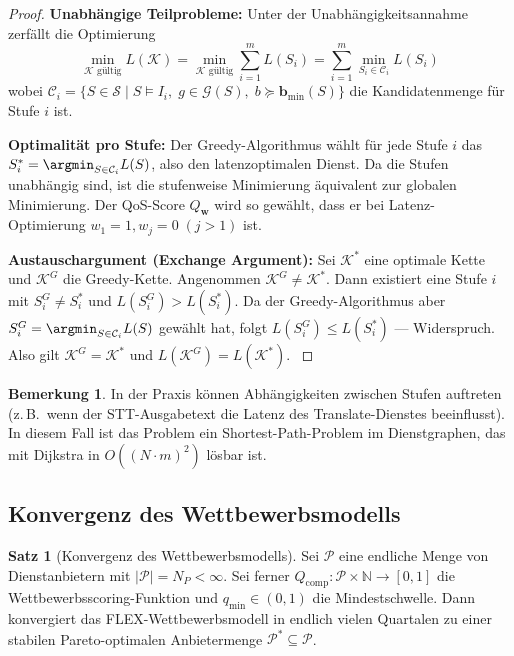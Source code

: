 ﻿\documentclass[a4paper,12pt]{article}
\theoremstyle{definition}
\newtheorem{satz}{Satz}
\newtheorem{bemerkung}{Bemerkung}
\begin{document}
\begin{proof}
\textbf{Unabhängige Teilprobleme:} Unter der Unabhängigkeitsannahme zerfällt die Optimierung
\[
\min_{\mathcal{K} \text{ gültig}} L(\mathcal{K}) = \min_{\mathcal{K} \text{ gültig}} \sum_{i=1}^m L(S_i) = \sum_{i=1}^m \min_{S_i \in \mathcal{C}_i} L(S_i)
\]
wobei $\mathcal{C}_i = \{S \in \mathcal{S} \mid S \models I_i,\; g \in \mathcal{G}(S),\; b \succeq \mathbf{b}_{\min}(S)\}$ die Kandidatenmenge für Stufe $i$ ist.

\textbf{Optimalität pro Stufe:} Der Greedy-Algorithmus wählt für jede Stufe $i$ das $S_i^* = \argmin_{S \in \mathcal{C}_i} L(S)$, also den latenzoptimalen Dienst. Da die Stufen unabhängig sind, ist die stufenweise Minimierung äquivalent zur globalen Minimierung. Der QoS-Score $Q_{\mathbf{w}}$ wird so gewählt, dass er bei Latenz-Optimierung $w_1 = 1, w_j = 0\; (j > 1)$ ist.

\textbf{Austauschargument (Exchange Argument):} Sei $\mathcal{K}^*$ eine optimale Kette und $\mathcal{K}^G$ die Greedy-Kette. Angenommen $\mathcal{K}^G \neq \mathcal{K}^*$. Dann existiert eine Stufe $i$ mit $S_i^G \neq S_i^*$ und $L(S_i^G) > L(S_i^*)$. Da der Greedy-Algorithmus aber $S_i^G = \argmin_{S \in \mathcal{C}_i} L(S)$ gewählt hat, folgt $L(S_i^G) \leq L(S_i^*)$ --- Widerspruch. Also gilt $\mathcal{K}^G = \mathcal{K}^*$ und $L(\mathcal{K}^G) = L(\mathcal{K}^*)$. $
$
\end{proof}

\begin{bemerkung}
In der Praxis können Abhängigkeiten zwischen Stufen auftreten (z.\,B.\ wenn der STT-Ausgabetext die Latenz des Translate-Dienstes beeinflusst). In diesem Fall ist das Problem ein Shortest-Path-Problem im Dienstgraphen, das mit Dijkstra in $O((N \cdot m)^2)$ lösbar ist.
\end{bemerkung}

\subsection{Konvergenz des Wettbewerbsmodells}

\begin{satz}[Konvergenz des Wettbewerbsmodells]
\label{satz:konvergenz}
Sei $\mathcal{P}$ eine endliche Menge von Dienstanbietern mit $|\mathcal{P}| = N_P < \infty$. Sei ferner $Q_\mathrm{comp}: \mathcal{P} \times \mathbb{N} \to [0,1]$ die Wettbewerbsscoring-Funktion und $q_\mathrm{min} \in (0,1)$ die Mindestschwelle. Dann konvergiert das FLEX-Wettbewerbsmodell in endlich vielen Quartalen zu einer stabilen Pareto-optimalen Anbietermenge $\mathcal{P}^* \subseteq \mathcal{P}$.
\end{satz}
\end{document}
